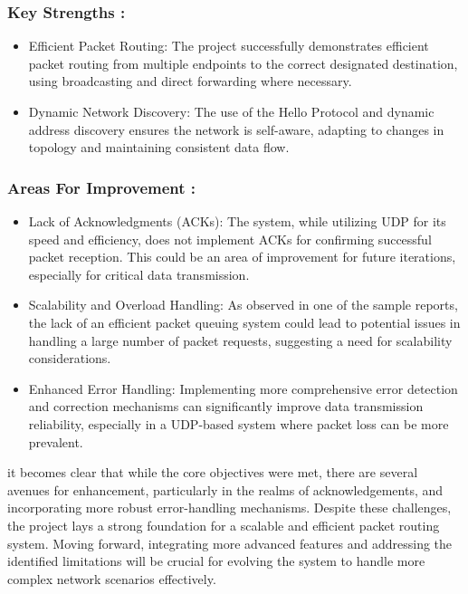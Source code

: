 \documentclass{article}
\begin{document}
\subsubsection*{Key Strengths : }

\begin{itemize}
	\item Efficient Packet Routing: The project successfully demonstrates efficient packet routing from multiple endpoints to the correct designated destination, using broadcasting and direct forwarding where necessary.
	\item Dynamic Network Discovery: The use of the Hello Protocol and dynamic address discovery ensures the network is self-aware, adapting to changes in topology and maintaining consistent data flow.
\end{itemize}

\subsubsection*{Areas For Improvement : }

\begin{itemize}
	\item Lack of Acknowledgments (ACKs): The system, while utilizing UDP for its speed and efficiency, does not implement ACKs for confirming successful packet reception. This could be an area of improvement for future iterations, especially for critical data transmission.
	\item Scalability and Overload Handling: As observed in one of the sample reports, the lack of an efficient packet queuing system could lead to potential issues in handling a large number of packet requests, suggesting a need for scalability considerations.
	\item Enhanced Error Handling: Implementing more comprehensive error detection and correction mechanisms can significantly improve data transmission reliability, especially in a UDP-based system where packet loss can be more prevalent.
\end{itemize}

it becomes clear that while the core objectives were met, there are several avenues for enhancement, particularly in the realms of acknowledgements, and incorporating more robust error-handling mechanisms. Despite these challenges, the project lays a strong foundation for a scalable and efficient packet routing system. Moving forward, integrating more advanced features and addressing the identified limitations will be crucial for evolving the system to handle more complex network scenarios effectively.
\end{document}
